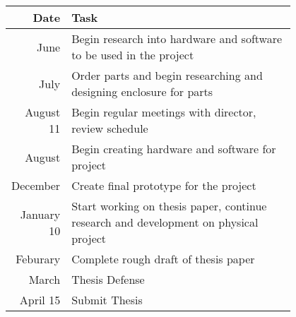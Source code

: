\documentclass[11pt]{article}
\begin{document}
\begin{tabular}{r|p{0.8\linewidth}}
	Date       & Task                                                                                 \\
	\hline
	June       & Begin research into hardware and software to be used in the project                  \\
	July       & Order parts and begin researching and designing enclosure for parts                  \\
	August 11  & Begin regular meetings with director, review schedule                                \\
	August     & Begin creating hardware and software for project                                     \\
	December   & Create final prototype for the project                                               \\
	January 10 & Start working on thesis paper, continue research and development on physical project \\
	Feburary   & Complete rough draft of thesis paper                                                 \\
	March      & Thesis Defense                                                                       \\
	April 15   & Submit Thesis                                                                        \\
\end{tabular}
\end{document}
